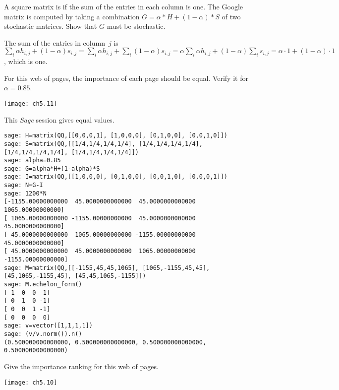 \begin{exercises}
  \item A square matrix is 
    if the sum of the entries in each column is one.
    The Google matrix is computed by taking a combination
    $G=\alpha*H+(1-\alpha)*S$ of two stochastic matrices.
    Show that $G$ must be stochastic.
    \begin{answer}
      The sum of the entries in column~$j$ is 
      $\sum_i \alpha h_{i,j}+(1-\alpha)s_{i,j}
       =\sum_i \alpha h_{i,j}+\sum_i (1-\alpha)s_{i,j}
       =\alpha\sum_i \alpha h_{i,j} +(1-\alpha)\sum_i s_{i,j}
       =\alpha\cdot 1+(1-\alpha)\cdot 1$,
      which is one.
    \end{answer}
  \item For this web of pages, the importance of each page should be equal.
    Verify it for $\alpha=0.85$.
    \begin{center}
      \texttt{[image: ch5.11]}
    \end{center}
    \begin{answer}
      This \textit{Sage} session gives equal values.
\begin{lstlisting}
sage: H=matrix(QQ,[[0,0,0,1], [1,0,0,0], [0,1,0,0], [0,0,1,0]])
sage: S=matrix(QQ,[[1/4,1/4,1/4,1/4], [1/4,1/4,1/4,1/4], [1/4,1/4,1/4,1/4], [1/4,1/4,1/4,1/4]])
sage: alpha=0.85     
sage: G=alpha*H+(1-alpha)*S    
sage: I=matrix(QQ,[[1,0,0,0], [0,1,0,0], [0,0,1,0], [0,0,0,1]])
sage: N=G-I
sage: 1200*N         
[-1155.00000000000  45.0000000000000  45.0000000000000  1065.00000000000]
[ 1065.00000000000 -1155.00000000000  45.0000000000000  45.0000000000000]
[ 45.0000000000000  1065.00000000000 -1155.00000000000  45.0000000000000]
[ 45.0000000000000  45.0000000000000  1065.00000000000 -1155.00000000000]
sage: M=matrix(QQ,[[-1155,45,45,1065], [1065,-1155,45,45], [45,1065,-1155,45], [45,45,1065,-1155]]) 
sage: M.echelon_form()       
[ 1  0  0 -1]
[ 0  1  0 -1]
[ 0  0  1 -1]
[ 0  0  0  0]
sage: v=vector([1,1,1,1])
sage: (v/v.norm()).n()
(0.500000000000000, 0.500000000000000, 0.500000000000000, 0.500000000000000)
\end{lstlisting}
    \end{answer}
  \item \cite{BryanLeise}
    Give the importance ranking for this web of pages.
    \begin{center}
      \texttt{[image: ch5.10]}
    \end{center}
    \begin{exparts}

\end{exparts}
\end{exercises}
